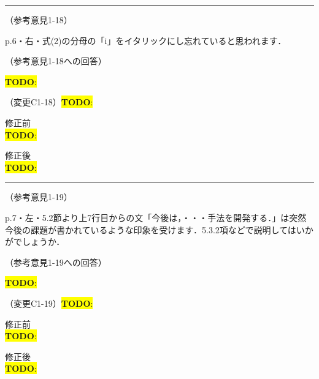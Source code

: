 \documentclass{jarticle} %
\newcommand{\todo}[1]{\colorbox{yellow}{{\bf TODO}:}{\color{blue}{\textbf{[#1]}}}}
\def\subsection#1{ \vspace{1pc} {\gt #1} }
\def\nextans{ \vspace{2pc} \hrule }
\begin{document}
\newpage
\nextans
\subsection{（参考意見1-18）}

p.6・右・式(2)の分母の「i」をイタリックにし忘れていると思われます．

\subsection{（参考意見1-18への回答）}

\todo{hoge}

\subsection{（変更C1-18）\todo{hoge}}
\vspace{-0.3cm}
\begin{description}
\item 修正前\\
\phantom{　}
\todo{hoge}
\vspace{-0.3cm}
\item 修正後\\
\phantom{　}
\todo{hoge}
\end{description}

\newpage
\nextans
\subsection{（参考意見1-19）}

p.7・左・5.2節より上7行目からの文「今後は，・・・手法を開発する．」は突然今後の課題が書かれているような印象を受けます．5.3.2項などで説明してはいかがでしょうか．

\subsection{（参考意見1-19への回答）}

\todo{hoge}

\subsection{（変更C1-19）\todo{hoge}}
\vspace{-0.3cm}
\begin{description}
\item 修正前\\
\phantom{　}
\todo{hoge}
\vspace{-0.3cm}
\item 修正後\\
\phantom{　}
\todo{hoge}
\end{description}
\end{document}
